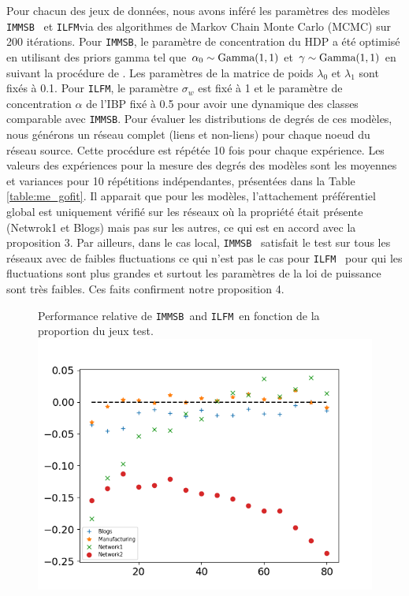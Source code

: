 \documentclass[french]{hermes-journal}
\renewcommand{\text}{\textnormal}
\newcommand{\ilfm}{\texttt{ILFM}}
\newcommand{\immsb}{\texttt{IMMSB}}
\begin{document}
Pour chacun des jeux de données, nous avons inféré les paramètres des modèles \immsb~ et \ilfm  via des algorithmes de Markov Chain Monte Carlo (MCMC) sur 200 itérations. Pour \immsb, le paramètre de concentration du HDP a été optimisé en utilisant des priors gamma tel que $\alpha_0 \sim \text{Gamma}(1,1)$ et $\gamma \sim \text{Gamma}(1,1)$ en suivant la procédure de \cite{HDP}. Les paramètres de la matrice de poids $\lambda_0$ et $\lambda_1$ sont fixés à 0.1. Pour \ilfm, le paramètre $\sigma_w$ est fixé à 1 et le paramètre de concentration $\alpha$ de l'IBP fixé à 0.5 pour avoir une dynamique des classes comparable avec \immsb. Pour évaluer les distributions de degrés de ces modèles, nous générons un réseau complet (liens et non-liens) pour chaque noeud du réseau source. Cette procédure est répétée 10 fois pour chaque expérience. Les valeurs des expériences pour la mesure des degrés des modèles  sont les moyennes et variances pour 10 répétitions indépendantes, présentées dans la Table \ref{table:me_gofit}. 
Il apparait que pour les modèles, l'attachement préférentiel global est uniquement vérifié sur les réseaux où la propriété était présente (Netwrok1 et Blogs) mais pas sur les autres, ce qui est en accord avec la proposition 3. Par ailleurs, dans le cas local, \immsb~ satisfait le test sur tous les réseaux avec de faibles fluctuations ce qui n'est pas le cas pour \ilfm~ pour qui les fluctuations sont plus grandes et surtout les paramètres de la loi de puissance sont très faibles. Ces faits confirment notre proposition 4.





\begin{figure}[h] {Performance relative de \immsb\ and \ilfm\ en fonction de la proportion du jeux test.} 
        \includegraphics[scale=0.45]{img/corpus/testset_max_20.png}
\label{fig:auc}
\end{figure}
\end{document}
